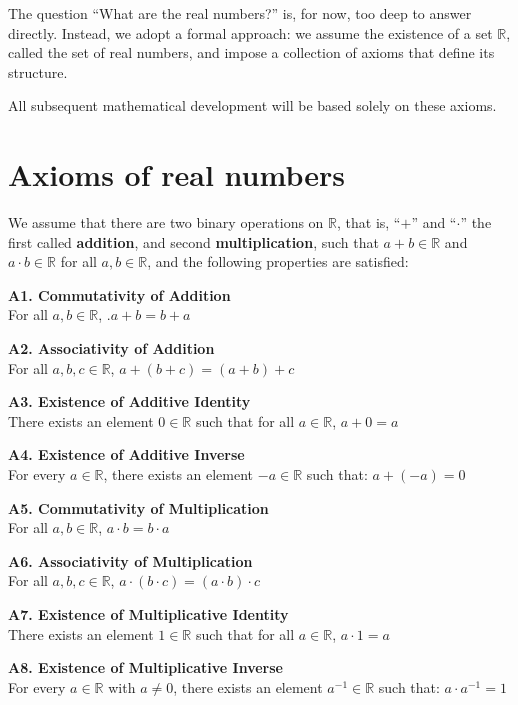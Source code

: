 \documentclass[
]{book}
\theoremstyle{definition}
\theoremstyle{definition}
\theoremstyle{definition}
\theoremstyle{definition}
\theoremstyle{remark}
\begin{document}
The question ``What are the real numbers?'' is, for now, too deep to answer directly. Instead, we adopt a formal approach: we assume the existence of a set \(\mathbb{R}\), called the set of real numbers, and impose a collection of axioms that define its structure.

All subsequent mathematical development will be based solely on these axioms.

\section{Axioms of real numbers}\label{axioms-of-real-numbers}

We assume that there are two binary operations on \(\mathbb{R}\), that is, ``\(+\)'' and ``\(\cdot\)'' the first called \textbf{addition}, and second \textbf{multiplication}, such that \(a + b \in \mathbb{R}\) and \(a\cdot b \in \mathbb{R}\) for all \(a, b \in \mathbb{R}\), and the following properties are satisfied:

\textbf{A1. Commutativity of Addition}\\
For all \(a, b \in \mathbb{R}\), .\(a + b = b + a\)

\textbf{A2. Associativity of Addition}\\
For all \(a, b, c \in \mathbb{R}\), \(a + (b + c) = (a + b) + c\)

\textbf{A3. Existence of Additive Identity}\\
There exists an element \(0 \in \mathbb{R}\) such that for all \(a \in \mathbb{R}\), \(a + 0 = a\)

\textbf{A4. Existence of Additive Inverse}\\
For every \(a \in \mathbb{R}\), there exists an element \(-a \in \mathbb{R}\) such that: \(a + (-a) = 0\)

\textbf{A5. Commutativity of Multiplication}\\
For all \(a, b \in \mathbb{R}\), \(a \cdot b = b \cdot a\)

\textbf{A6. Associativity of Multiplication}\\
For all \(a, b, c \in \mathbb{R}\), \(a \cdot (b \cdot c) = (a \cdot b) \cdot c\)

\textbf{A7. Existence of Multiplicative Identity}\\
There exists an element \(1 \in \mathbb{R}\) such that for all \(a \in \mathbb{R}\), \(a \cdot 1 = a\)

\textbf{A8. Existence of Multiplicative Inverse}\\
For every \(a \in \mathbb{R}\) with \(a \ne 0\), there exists an element \(a^{-1} \in \mathbb{R}\) such that: \(a \cdot a^{-1} = 1\)
\end{document}
